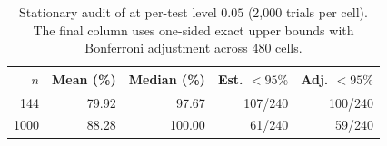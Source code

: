 \begin{table}[!t]
\centering
\footnotesize
\caption{Stationary audit of \milad{} at per-test level $0.05$ (2,000 trials per cell). The final column uses one-sided exact upper bounds with Bonferroni adjustment across 480 cells.}
\label{tab:compact-grid}
\setlength{\tabcolsep}{4pt}
\begin{tabular}{rrrrr}
\toprule
$n$ & Mean (\%) & Median (\%) & Est. $<95\%$ & Adj. $<95\%$ \\
\midrule
144 & 79.92 & 97.67 & 107/240 & 100/240 \\
1000 & 88.28 & 100.00 & 61/240 & 59/240 \\
\bottomrule
\end{tabular}
\end{table}
